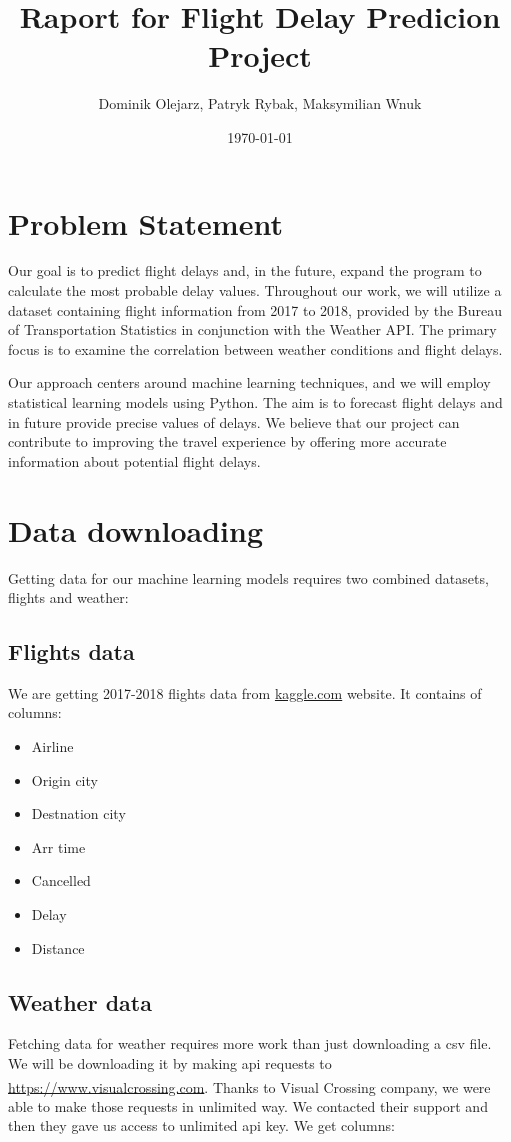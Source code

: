 \documentclass{article}
\title{Raport for Flight Delay Predicion Project} %
\author{Dominik Olejarz, Patryk Rybak, Maksymilian Wnuk} %
\date{\today} %
\begin{document}
 \maketitle
    
 \section{Problem Statement} %

Our goal is to predict flight delays and, in the future, expand the program to calculate the most probable delay values. Throughout our work, we will utilize a dataset containing flight information from 2017 to 2018, provided by the Bureau of Transportation Statistics in conjunction with the Weather API. The primary focus is to examine the correlation between weather conditions and flight delays.

Our approach centers around machine learning techniques, and we will employ statistical learning models using Python. The aim is to forecast flight delays and in future provide precise values of delays. We believe that our project can contribute to improving the travel experience by offering more accurate information about potential flight delays.

    
 \section{Data downloading}
Getting data for our machine learning models requires two combined datasets, 
flights and weather:
	\subsection{Flights data}
		We are getting 2017-2018 flights data from \url{kaggle.com} website.
		It contains of columns:	
			\begin{itemize}
\item Airline 
\item Origin city 
\item Destnation city
\item Arr time  
\item Cancelled 
\item Delay  
\item Distance  
				
			\end{itemize}

	\subsection{Weather data}
		Fetching data for weather requires more work than just downloading a csv file.
		We will be downloading it by making api requests to \url{https://www.visualcrossing.com}.
		Thanks to Visual Crossing\textsuperscript{\tiny\textregistered} company, we were able to make those requests in unlimited way.
		We contacted their support and then they gave us access to unlimited api key. We
		get columns:
\end{document}
